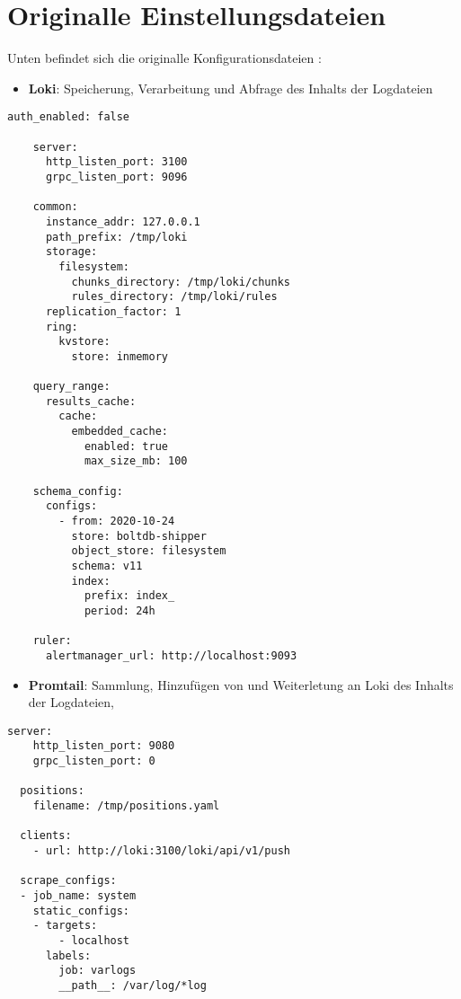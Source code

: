 \section{Originalle Einstellungsdateien}\label{appendix:orgGrafana}

Unten befindet sich die originalle Konfigurationsdateien \citep{GrafanaLoki_run}:

\begin{itemize}[noitemsep]
    \item \textbf{Loki}: Speicherung, Verarbeitung und Abfrage des Inhalts der Logdateien
\end{itemize}

{
\begin{Verbatim}[frame=single]
    auth_enabled: false

    server:
      http_listen_port: 3100
      grpc_listen_port: 9096
    
    common:
      instance_addr: 127.0.0.1
      path_prefix: /tmp/loki
      storage:
        filesystem:
          chunks_directory: /tmp/loki/chunks
          rules_directory: /tmp/loki/rules
      replication_factor: 1
      ring:
        kvstore:
          store: inmemory
    
    query_range:
      results_cache:
        cache:
          embedded_cache:
            enabled: true
            max_size_mb: 100
    
    schema_config:
      configs:
        - from: 2020-10-24
          store: boltdb-shipper
          object_store: filesystem
          schema: v11
          index:
            prefix: index_
            period: 24h
    
    ruler:
      alertmanager_url: http://localhost:9093
\end{Verbatim}
}

\newpage
\begin{itemize}[noitemsep]
    \item \textbf{Promtail}: Sammlung, Hinzufügen von  und Weiterletung an Loki des Inhalts der Logdateien,
\end{itemize}

{
\begin{Verbatim}[frame=single]
    server:
    http_listen_port: 9080
    grpc_listen_port: 0
  
  positions:
    filename: /tmp/positions.yaml
  
  clients:
    - url: http://loki:3100/loki/api/v1/push
  
  scrape_configs:
  - job_name: system
    static_configs:
    - targets:
        - localhost
      labels:
        job: varlogs
        __path__: /var/log/*log
  
\end{Verbatim}
}